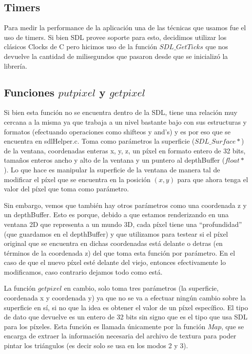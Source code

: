 \documentclass[a4paper]{article}
\begin{document}
\subsection{Timers}
Para medir la performance de la aplicación una de las técnicas que usamos fue el uso de timers. Si bien SDL provee soporte para esto, decidimos utilizar los clásicos Clocks de C pero hicimos uso de la función $SDL\_GetTicks$ que nos devuelve la cantidad de milisegundos que pasaron desde que se inicializó la librería.

\subsection{Funciones $putpixel$ y $getpixel$} \label{putpixel}
Si bien esta función no se encuentra dentro de la SDL, tiene una relación muy cercana a la misma ya que trabaja a un nivel bastante bajo con sus estructuras y formatos (efectuando operaciones como shifteos y and's) y es por eso que se encuentra en sdlHelper.c.
Toma como parámetros la superficie ($SDL\_Surface*$) de la ventana, coordenadas enteras x, y, z, un píxel en formato entero de 32 bits, tamaños enteros ancho y alto de la ventana y un puntero al depthBuffer ($float*$). Lo que hace es manipular la superficie de la ventana de manera tal de modificar el píxel que se encuentra en la posición $(x, y)$ para que ahora tenga el valor del píxel que toma como parámetro. 
\par Sin embargo, vemos que también hay otros parámetros como una coordenada z y un depthBuffer. Esto es porque, debido a que estamos renderizando en una ventana 2D que representa a un mundo 3D, cada píxel tiene una ``profundidad'' (que guardamos en el depthBuffer) y que utilizamos para testear si el píxel original que se encuentra en dichas coordenadas está delante o detras (en términos de la coordenada z) del que toma esta función por parámetro.
En el caso de que el nuevo píxel esté delante del viejo, entonces efectivamente lo modificamos, caso contrario dejamos
 todo como está.
 
 
La función $getpixel$ en cambio, solo toma tres parámetros (la superficie, coordenada x y coordenada y) ya que no se va a efectuar ningún cambio sobre la superficie en sí, si no que la idea es obtener el valor de un píxel específico. El tipo de dato que devuelve es un entero de 32 bits sin signo que es el tipo que usa SDL para los píxeles. Esta función es llamada únicamente por la función $Map$, que se encarga de extraer la información necesaria del archivo de textura para poder pintar los triángulos (es decir solo se usa en los modos 2 y 3).
\end{document}
